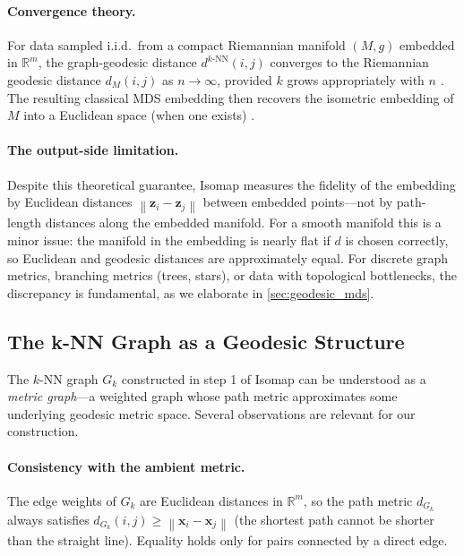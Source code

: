 \documentclass[twoside,11pt]{article}
\newcommand{\R}{\mathbb{R}}
\newcommand{\bx}{\mathbf{x}}
\newcommand{\bz}{\mathbf{z}}
\newcommand{\norm}[1]{\left\|#1\right\|}
\newcommand{\dknn}{d^{k\text{-NN}}}
\newcommand{\Gk}{G_k}
\begin{document}
\paragraph{Convergence theory.}
For data sampled i.i.d.\ from a compact Riemannian manifold $(M, g)$
embedded in $\R^m$, the graph-geodesic distance $\dknn(i,j)$ converges
to the Riemannian geodesic distance $d_M(i,j)$ as $n \to \infty$, provided
$k$ grows appropriately with $n$ \citep{bernstein2000graph,
tenenbaum2000global, zha2003continuum, donoho2003hessian}.
The resulting classical MDS embedding then recovers the isometric embedding
of $M$ into a Euclidean space (when one exists) \citep{tenenbaum2000global}.

\paragraph{The output-side limitation.}
Despite this theoretical guarantee, Isomap measures the fidelity of the
embedding by Euclidean distances $\norm{\bz_i - \bz_j}$ between embedded
points---not by path-length distances along the embedded manifold.  For a
smooth manifold this is a minor issue: the manifold in the embedding is
nearly flat if $d$ is chosen correctly, so Euclidean and geodesic distances
are approximately equal.  For discrete graph metrics, branching metrics
(trees, stars), or data with topological bottlenecks, the discrepancy is
fundamental, as we elaborate in \cref{sec:geodesic_mds}.

\subsection{The k-NN Graph as a Geodesic Structure}
\label{sec:knn_graph}

The $k$-NN graph $\Gk$ constructed in step 1 of Isomap can be understood
as a \emph{metric graph}---a weighted graph whose path metric approximates
some underlying geodesic metric space.  Several observations are relevant
for our construction.

\paragraph{Consistency with the ambient metric.}
The edge weights of $\Gk$ are Euclidean distances in $\R^m$, so the path
metric $d_{\Gk}$ always satisfies $d_{\Gk}(i,j) \geq \norm{\bx_i - \bx_j}$
(the shortest path cannot be shorter than the straight line).  Equality
holds only for pairs connected by a direct edge.
\end{document}
